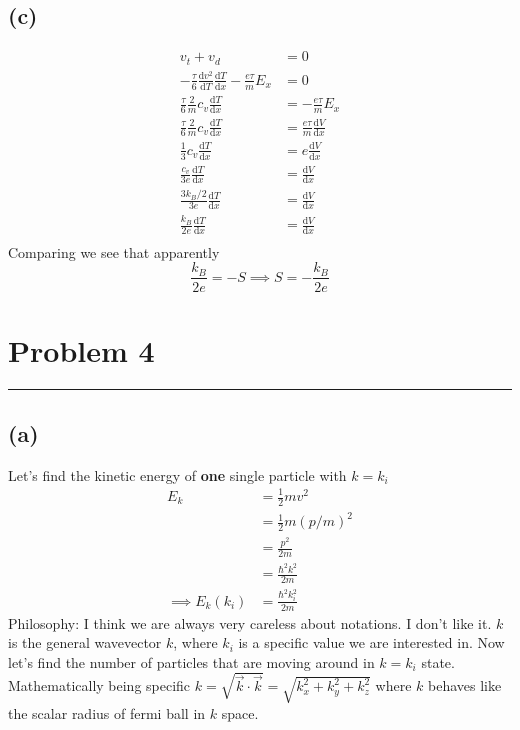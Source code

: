 \documentclass[letter, 10pts]{article}
\newcommand{\hb}{\hbar}
\begin{document}
\subsection*{(c)} 
\begin{align*}
	v_t + v_d &= 0 \\
- \frac{\tau}{6} \frac{\mathrm{d} v^2}{\mathrm{d} T} \frac{\mathrm{d} T}{\mathrm{d} x} 
	- \frac{e \tau}{m} E_x   & = 0 \\ 
	\frac{\tau}{6} \frac{2}{m} c_v \frac{\mathrm{d} T}{\mathrm{d} x} &= - \frac{e \tau}{ m} E_x \\ 
	\frac{\tau}{6} \frac{2}{m} c_v \frac{\mathrm{d} T}{\mathrm{d} x} &=  \frac{e \tau}{ m} \frac{\mathrm{d} V}{\mathrm{d} x} \\ 
	\frac{1}{3}  c_v \frac{\mathrm{d} T}{\mathrm{d} x} &=  e \frac{\mathrm{d} V}{\mathrm{d} x} \\ 
	\frac{c_v}{3e} \frac{\mathrm{d} T}{\mathrm{d} x} &=  \frac{\mathrm{d} V}{\mathrm{d} x} \\ 
	\frac{3 k_B / 2}{3e} \frac{\mathrm{d} T}{\mathrm{d} x} &=  \frac{\mathrm{d} V}{\mathrm{d} x} \\ 
	\frac{k_B }{2e} \frac{\mathrm{d} T}{\mathrm{d} x} &=  \frac{\mathrm{d} V}{\mathrm{d} x} \\ 
\end{align*}
Comparing we see that apparently 
\[
\frac{k_B}{2 e} = - S \implies S = - \frac{k_B}{2 e 
}
\] 



\section*{Problem 4} 
\hrule
\subsection*{(a)} 
Let's find the kinetic energy of \textbf{one} single particle with $k = k_i$
\begin{align*}
E_k &= \frac{1}{2}m v^2 \\
&= \frac{1}{2} m (p / m)^2  \\
&= \frac{p^2}{2m}  \\
&= \frac{\hb ^2 k^2}{2m} \\
\implies 
E_k (k_i) &= \frac{\hb ^2 k_i^2}{2m }
\end{align*}
Philosophy: I think we are always very careless about notations. I don't like it. $k$ is the general wavevector $k$, where $k_i$ is a specific value we are interested in. Now let's find the number of particles that are moving around in $k = k_i$ state.  Mathematically being specific $k = \sqrt{\vec{k} \cdot  \vec{k}}  = \sqrt{k_x^2 + k_y^2+ k_z^2}  $ where $k$ behaves like the scalar radius of fermi ball in $k$ space. 
\end{document}
